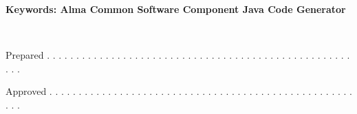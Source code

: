 \documentclass[letterpaper,11pt]{article}
\newcommand\PreparedA{Alexis Tejeda}
\newcommand\PDate{2010-04-23 }
\newcommand\Approved{}
\newcommand\Keywords{Alma Common Software Component Java Code Generator}
\begin{document}
\begin{center}
\vspace{2.5cm}

%
%
%

\vspace{-1.5cm}
\begin{center}
\normalsize
{\bf Keywords: \Keywords}
\end{center}
\vspace{0.5cm}

{\small {\tt \hspace{-0.8cm}{\PreparedA} \hspace{2.2cm}{\PDate }}}  %
\vspace{-0.3cm}

\large
\hspace{-0.7cm} {Prepared  \small . . . . . . . . . . . . . . . . . . . . . . . . . . . . . . . . . . . . . . . . . . . . . . . . . . . . . . .}

\footnotesize
\hspace{2.5cm}{Name} \hspace{4cm}{Date}  \hspace{2cm}{Signature}
\vspace{1cm}


\vspace{-0.3cm}



\normalsize
{\small {\tt \hspace{-5.5cm}{\Approved}}}     %
\vspace{-0.3cm}

\large
\hspace{-0.7cm} {Approved  \small . . . . . . . . . . . . . . . . . . . . . . . . . . . . . . . . . . . . . . . . . . . . . . . . . . . . . . .}


\end{center}
\end{document}
